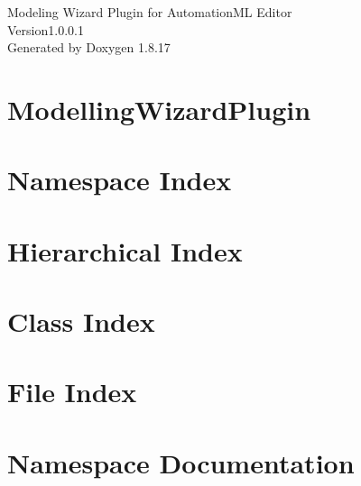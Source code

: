 \let\mypdfximage\pdfximage\def\pdfximage{\immediate\mypdfximage}\documentclass[twoside]{book}
\newcommand{\+}{\discretionary{\mbox{\scriptsize$\hookleftarrow$}}{}{}}
\newcommand{\clearemptydoublepage}{%
  \newpage{\pagestyle{empty}\cleardoublepage}%
}
\begin{document}
\hypersetup{pageanchor=false,
             bookmarksnumbered=true,
             pdfencoding=unicode
            }
\begin{titlepage}
\vspace*{7cm}
\begin{center}%
{\Large Modeling Wizard Plugin for Automation\+ML Editor \\[1ex]\large Version1.\+0.\+0.\+1 }\\
\vspace*{1cm}
{\large Generated by Doxygen 1.8.17}\\
\end{center}
\end{titlepage}
\clearemptydoublepage
{}
\tableofcontents
\clearemptydoublepage
{}
\hypersetup{pageanchor=true}

\chapter{Modelling\+Wizard\+Plugin}
\label{md__r_e_a_d_m_e}

\chapter{Namespace Index}

\chapter{Hierarchical Index}

\chapter{Class Index}

\chapter{File Index}

\chapter{Namespace Documentation}



\end{document}
